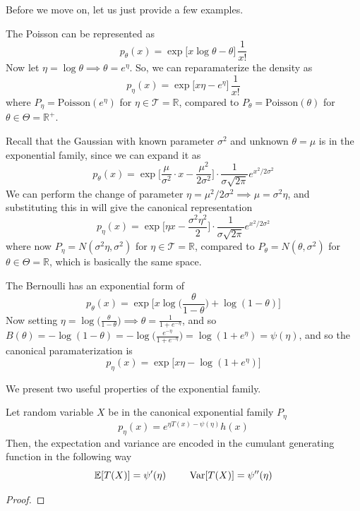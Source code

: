     Before we move on, let us just provide a few examples. 

    \begin{example}[Poisson]
    The Poisson can be represented as 
    \[p_\theta (x) = \exp \big[ x \log{\theta} - \theta \big] \, \frac{1}{x!}\]
    Now let $\eta = \log{\theta} \implies \theta = e^{\eta}$. So, we can reparamaterize the density as 
    \[p_\eta(x) = \exp \big[ x \eta - e^\eta \big] \, \frac{1}{x!}\]
    where $P_\eta = \mathrm{Poisson}(e^\eta)$ for $\eta \in \mathcal{T} = \mathbb{R}$, compared to $P_\theta = \mathrm{Poisson}(\theta)$ for $\theta \in \Theta = \mathbb{R}^+$. 
    \end{example}

    \begin{example}[Gaussian]
    Recall that the Gaussian with known parameter $\sigma^2$ and unknown $\theta = \mu$ is in the exponential family, since we can expand it as 
    \[p_\theta (x) = \exp \bigg[ \frac{\mu}{\sigma^2} \cdot x - \frac{\mu^2}{2 \sigma^2} \bigg] \cdot \frac{1}{\sigma \sqrt{2\pi}} e^{x^2/2 \sigma^2}\]
    We can perform the change of parameter $\eta = \mu^2 / 2\sigma^2 \implies \mu = \sigma^2 \eta$, and substituting this in will give the canonical representation 
    \[p_\eta (x) = \exp \Big[ \eta x - \frac{\sigma^2 \eta^2}{2} \Big] \cdot \frac{1}{\sigma \sqrt{2\pi}} e^{x^2/2 \sigma^2}\]
    where now $P_\eta = N(\sigma^2 \eta, \sigma^2)$ for $\eta \in \mathcal{T} = \mathbb{R}$, compared to $P_\theta = N(\theta, \sigma^2)$ for $\theta \in \Theta = \mathbb{R}$, which is basically the same space. 
    \end{example}

    \begin{example}[Bernoulli]
    The Bernoulli has an exponential form of 
    \[p_\theta (x) = \exp \bigg[ x \log \Big( \frac{\theta}{1 - \theta} \Big) + \log(1 - \theta)\bigg]\]
    Now setting $\eta = \log\big( \frac{\theta}{1 - \theta} \big) \implies \theta = \frac{1}{1 + e^{-\eta}}$, and so $B(\theta) = - \log(1 - \theta) = - \log \big( \frac{e^{-\eta}}{1 + e^{-\eta}} \big) = \log(1 + e^\eta) = \psi(\eta)$, and so the canonical paramaterization is 
    \[p_\eta (x) = \exp \big[ x \eta - \log(1 + e^{\eta}) \big]\]
    \end{example}


    We present two useful properties of the exponential family. 

    \begin{theorem}[Moments]
    Let random variable $X$ be in the canonical exponential family $P_\eta$ 
    \[p_\eta (x) = e^{\eta T(x) - \psi(\eta)} h(x)\]
    Then, the expectation and variance are encoded in the cumulant generating function in the following way 
    \[\mathbb{E} [T(X)] = \psi^\prime (\eta) \;\;\;\;\;\;\;\; \Var[T(X)] = \psi^{\prime\prime} (\eta)\]
    \end{theorem}
    \begin{proof}

    \end{proof}

